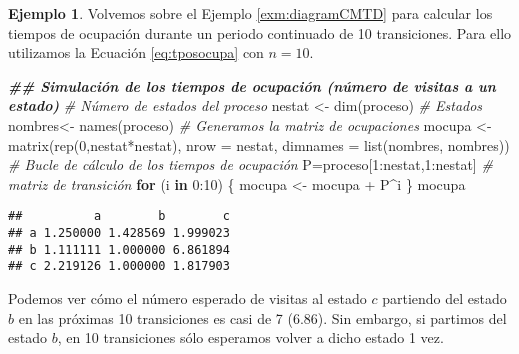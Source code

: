 \documentclass[
]{book}
\newenvironment{Shaded}{\begin{snugshade}}{\end{snugshade}}
\newcommand{\AttributeTok}[1]{\textcolor[rgb]{0.77,0.63,0.00}{#1}}
\newcommand{\CommentTok}[1]{\textcolor[rgb]{0.56,0.35,0.01}{\textit{#1}}}
\newcommand{\ControlFlowTok}[1]{\textcolor[rgb]{0.13,0.29,0.53}{\textbf{#1}}}
\newcommand{\DecValTok}[1]{\textcolor[rgb]{0.00,0.00,0.81}{#1}}
\newcommand{\DocumentationTok}[1]{\textcolor[rgb]{0.56,0.35,0.01}{\textbf{\textit{#1}}}}
\newcommand{\FunctionTok}[1]{\textcolor[rgb]{0.00,0.00,0.00}{#1}}
\newcommand{\NormalTok}[1]{#1}
\newcommand{\OtherTok}[1]{\textcolor[rgb]{0.56,0.35,0.01}{#1}}
\newcommand{\SpecialCharTok}[1]{\textcolor[rgb]{0.00,0.00,0.00}{#1}}
\theoremstyle{definition}
\theoremstyle{definition}
\newtheorem{example}{Ejemplo}[chapter]
\theoremstyle{definition}
\theoremstyle{definition}
\theoremstyle{remark}
\begin{document}
\begin{example}
Volvemos sobre el Ejemplo \ref{exm:diagramCMTD} para calcular los tiempos de ocupación durante un periodo continuado de 10 transiciones. Para ello utilizamos la Ecuación \eqref{eq:tposocupa} con \(n=10\).

\begin{Shaded}
\begin{Highlighting}[]
\DocumentationTok{\#\# Simulación de los tiempos de ocupación (número de visitas a un estado)}
\CommentTok{\# Número de estados del proceso}
\NormalTok{nestat }\OtherTok{\textless{}{-}} \FunctionTok{dim}\NormalTok{(proceso)}
\CommentTok{\# Estados}
\NormalTok{nombres}\OtherTok{\textless{}{-}} \FunctionTok{names}\NormalTok{(proceso)}
\CommentTok{\# Generamos la matriz de ocupaciones}
\NormalTok{mocupa }\OtherTok{\textless{}{-}} \FunctionTok{matrix}\NormalTok{(}\FunctionTok{rep}\NormalTok{(}\DecValTok{0}\NormalTok{,nestat}\SpecialCharTok{*}\NormalTok{nestat),}
                 \AttributeTok{nrow =}\NormalTok{ nestat, }\AttributeTok{dimnames =} \FunctionTok{list}\NormalTok{(nombres, nombres))}
\CommentTok{\# Bucle de cálculo de los tiempos de ocupación}
\NormalTok{P}\OtherTok{=}\NormalTok{proceso[}\DecValTok{1}\SpecialCharTok{:}\NormalTok{nestat,}\DecValTok{1}\SpecialCharTok{:}\NormalTok{nestat] }\CommentTok{\# matriz de transición}
\ControlFlowTok{for}\NormalTok{ (i }\ControlFlowTok{in} \DecValTok{0}\SpecialCharTok{:}\DecValTok{10}\NormalTok{)}
\NormalTok{\{}
\NormalTok{   mocupa }\OtherTok{\textless{}{-}}\NormalTok{ mocupa }\SpecialCharTok{+}\NormalTok{ P}\SpecialCharTok{\^{}}\NormalTok{i}
\NormalTok{\}}
\NormalTok{mocupa}
\end{Highlighting}
\end{Shaded}

\begin{verbatim}
##          a        b        c
## a 1.250000 1.428569 1.999023
## b 1.111111 1.000000 6.861894
## c 2.219126 1.000000 1.817903
\end{verbatim}

Podemos ver cómo el número esperado de visitas al estado \(c\) partiendo del estado \(b\) en las próximas 10 transiciones es casi de 7 (6.86). Sin embargo, si partimos del estado \(b\), en 10 transiciones sólo esperamos volver a dicho estado 1 vez.
\end{example}
\end{document}
